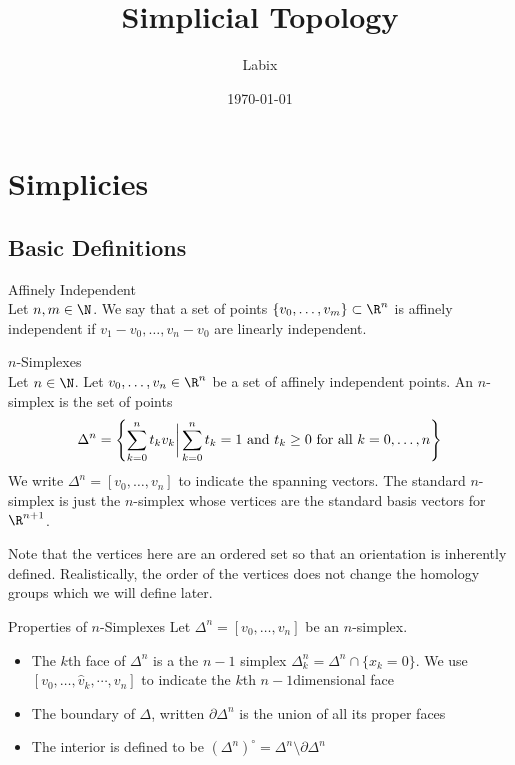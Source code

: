 \documentclass[a4paper]{article}
\title{Simplicial Topology}
\author{Labix}
\date{\today}
\begin{document}
\maketitle

\pagebreak
\tableofcontents

\pagebreak
\section{Simplicies}
\subsection{Basic Definitions}
\begin{defn}{Affinely Independent}{}{}\\
Let $n,m\in\N$. We say that a set of points $\{v_0,\dots,v_m\}\subset\R^n$ is affinely independent if $v_1-v_0,\dots,v_n-v_0$ are linearly independent. 
\end{defn}

\begin{defn}{$n$-Simplexes}{}\\
Let $n\in\N$. Let $v_0,\dots,v_n\in\R^n$ be a set of affinely independent points. An $n$-simplex is the set of points $$\Delta^n=\left\{\sum_{k=0}^nt_kv_k\bigg{|}\sum_{k=0}^nt_k=1\text{ and }t_k\geq 0\text{ for all }k=0,\dots,n\right\}$$ We write $\Delta^n=[v_0,\dots,v_n]$ to indicate the spanning vectors. The standard $n$-simplex is just the $n$-simplex whose vertices are the standard basis vectors for $\R^{n+1}$. 
\end{defn}

Note that the vertices here are an ordered set so that an orientation is inherently defined. Realistically, the order of the vertices does not change the homology groups which we will define later. 

\begin{defn}{Properties of $n$-Simplexes}{} Let $\Delta^n=[v_0,\dots,v_n]$ be an $n$-simplex. 
\begin{itemize}
\item The $k$th face of $\Delta^n$ is a the $n-1$ simplex $\Delta_k^n=\Delta^n\cap\{x_k=0\}$. We use $[v_0,\dots,\hat{v}_k,\cdots,v_n]$ to indicate the $k$th $n-1$dimensional face
\item The boundary of $\Delta$, written $\partial\Delta^n$ is the union of all its proper faces
\item The interior is defined to be $(\Delta^n)^\circ=\Delta^n\setminus\partial\Delta^n$
\end{itemize}
\end{defn}
\end{document}
